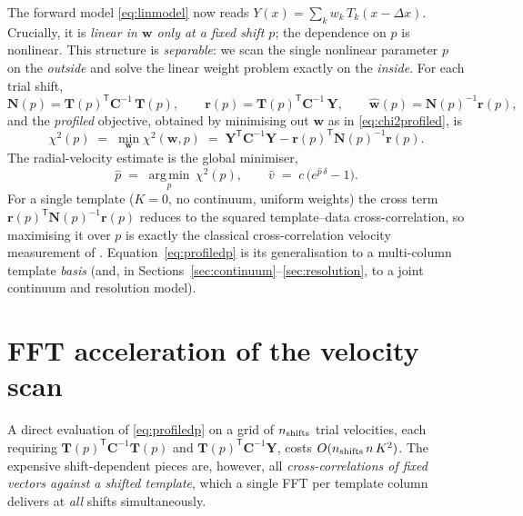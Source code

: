 \documentclass[11pt]{article}
\newcommand{\T}{\mathsf{T}}                    %
\newcommand{\dx}{\Delta x}                     %
\newcommand{\argmin}{\operatorname*{arg\,min}}
\begin{document}
The forward model \eqref{eq:linmodel} now reads
$Y(x)=\sum_k w_k\,T_k(x-\dx)$. Crucially, it is \emph{linear in $\mathbf{w}$ only
at a fixed shift $p$}; the dependence on $p$ is nonlinear. This structure is
\emph{separable}: we scan the single nonlinear parameter $p$ on the
\emph{outside} and solve the linear weight problem exactly on the \emph{inside}.
For each trial shift,
\begin{equation}
  \mathbf{N}(p) = \mathbf{T}(p)^\T\mathbf{C}^{-1}\,\mathbf{T}(p),
  \qquad
  \mathbf{r}(p) = \mathbf{T}(p)^\T\mathbf{C}^{-1}\,\mathbf{Y},
  \qquad
  \widehat{\mathbf{w}}(p)=\mathbf{N}(p)^{-1}\mathbf{r}(p),
  \label{eq:shiftsolve}
\end{equation}
and the \emph{profiled} objective, obtained by minimising out $\mathbf{w}$ as in
\eqref{eq:chi2profiled}, is
\begin{equation}
  \chi^2(p)\;=\;\min_{\mathbf{w}}\chi^2(\mathbf{w},p)
  \;=\;\mathbf{Y}^\T\mathbf{C}^{-1}\mathbf{Y}-\mathbf{r}(p)^\T\mathbf{N}(p)^{-1}\mathbf{r}(p).
  \label{eq:profiledp}
\end{equation}
The radial-velocity estimate is the global minimiser,
\begin{equation}
  \widehat{p}\;=\;\argmin_{p}\,\chi^2(p),
  \qquad
  \widehat{v}\;=\;c\,\big(e^{\widehat{p}\,\delta}-1\big).
\end{equation}
For a single template ($K=0$, no continuum, uniform weights) the cross term
$\mathbf{r}(p)^\T\mathbf{N}(p)^{-1}\mathbf{r}(p)$ reduces to the squared
template--data cross-correlation, so maximising it over $p$ is exactly the
classical cross-correlation velocity measurement of \citet*{TonryDavis1979}.
Equation~\eqref{eq:profiledp} is its generalisation to a multi-column template
\emph{basis} (and, in Sections~\ref{sec:continuum}--\ref{sec:resolution}, to a
joint continuum and resolution model).

\section{FFT acceleration of the velocity scan}
\label{sec:fft}
A direct evaluation of \eqref{eq:profiledp} on a grid of $n_{\rm shifts}$ trial
velocities, each requiring $\mathbf{T}(p)^\T\mathbf{C}^{-1}\mathbf{T}(p)$ and
$\mathbf{T}(p)^\T\mathbf{C}^{-1}\mathbf{Y}$, costs
$O(n_{\rm shifts}\,n\,K^2)$. The expensive shift-dependent pieces are, however,
all \emph{cross-correlations of fixed vectors against a shifted template}, which a
single FFT per template column delivers at \emph{all} shifts simultaneously.
\end{document}
